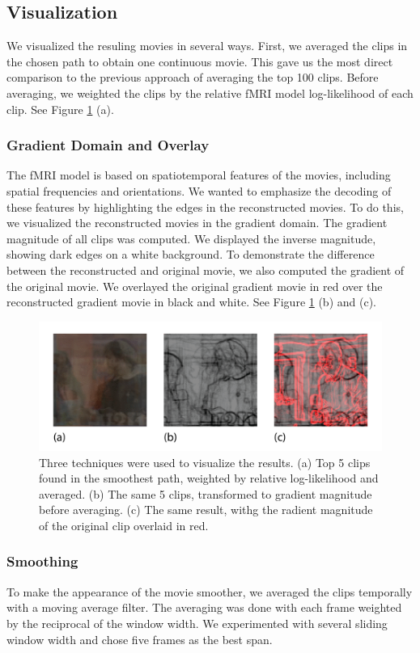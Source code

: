 \subsection{Visualization}
We visualized the resuling movies in several ways. First, we averaged the clips in the chosen path to obtain one continuous movie. This gave us the most direct comparison to the previous approach of averaging the top 100 clips. Before averaging, we weighted the clips by the relative fMRI model log-likelihood of each clip. See Figure \ref{fig:viz} (a).

\subsubsection{Gradient Domain and Overlay}
The fMRI model is based on spatiotemporal features of the movies, including spatial frequencies and orientations. We wanted to emphasize the decoding of these features by highlighting the edges in the reconstructed movies. To do this, we visualized the reconstructed movies in the gradient domain. The gradient magnitude of all clips was computed. We displayed the inverse magnitude, showing dark edges on a white background. To demonstrate the difference between the reconstructed and original movie, we also computed the gradient of the original movie. We overlayed the original gradient movie in red over the reconstructed gradient movie in black and white. See Figure \ref{fig:viz} (b) and (c).

\begin{figure}
\centering
    \includegraphics[width=1.0\columnwidth]{figures/vizfig.png}
\caption{Three techniques were used to visualize the results. (a) Top 5 clips found in the smoothest path, weighted by relative log-likelihood and averaged. (b) The same 5 clips, transformed to gradient magnitude before averaging. (c) The same result, withg the radient magnitude of the original clip overlaid in red.}
\label{fig:viz}
\end{figure}

\subsubsection{Smoothing}
To make the appearance of the movie smoother, we averaged the clips temporally with a moving average filter. The averaging was done with each frame weighted by the reciprocal of the window width. We experimented with several sliding window width and chose five frames as the best span.